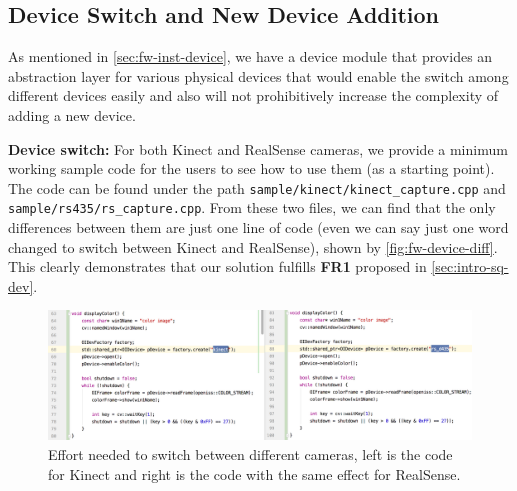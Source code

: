 
\subsection{Device Switch and New Device Addition}
\label{sec:Eval-framework-device}

As mentioned in \autoref{sec:fw-inst-device}, we have a device module that
provides an abstraction layer for various physical devices
that would enable the switch among different devices easily and also will not 
prohibitively increase the complexity of adding a new device.

\textbf{Device switch:}  For both Kinect and RealSense cameras, we provide a
minimum working sample code for the users to see how to use them (as a starting
point). The code can be found under the path
\texttt{sample/kinect/kinect\_capture.cpp} and
\texttt{sample/rs435/rs\_capture.cpp}. From these two files, we can find that
the only differences between them are just one line of code (even we can say
just one word changed to switch between Kinect and RealSense), shown by
\autoref{fig:fw-device-diff}. This clearly demonstrates that our solution
fulfills \textbf{FR1} proposed in \autoref{sec:intro-sq-dev}.

\begin{figure}
    \includegraphics[width=\linewidth]{figures/framework_device_diff.png}
    \caption[Effort needed to switch between different cameras]
    {Effort needed to switch between different cameras, left is the code for Kinect
        and right is the code with the same effect for RealSense.}
    \label{fig:fw-device-diff}
\end{figure}

